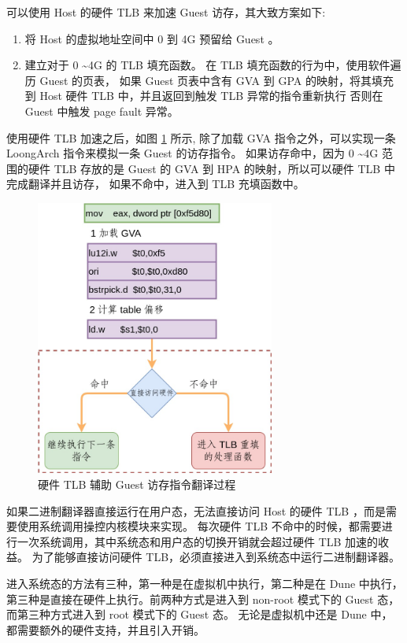 可以使用 Host 的硬件 TLB 来加速 Guest 访存，其大致方案如下:
\begin{enumerate}
	\item 将 Host 的虚拟地址空间中 0 到 4G 预留给 Guest 。
	\item 建立对于 0 \textasciitilde 4G 的 TLB 填充函数。 在 TLB 填充函数的行为中，使用软件遍历 Guest 的页表，
	      如果 Guest 页表中含有 GVA 到 GPA 的映射，将其填充到 Host 硬件 TLB 中，并且返回到触发 TLB 异常的指令重新执行
	      否则在 Guest 中触发 page fault 异常。
\end{enumerate}
使用硬件 TLB 加速之后，如图 \ref{fig:hamt} 所示, 除了加载 GVA 指令之外，可以实现一条 LoongArch 指令来模拟一条 Guest 的访存指令。
如果访存命中，因为 0 \textasciitilde 4G 范围的硬件 TLB 存放的是 Guest 的 GVA 到 HPA 的映射，所以可以硬件 TLB 中完成翻译并且访存，
如果不命中，进入到 TLB 充填函数中。

\begin{figure}[!htbp]
	\centering
	\includegraphics[width=0.7\textwidth]{./images/hamt.jpg}
	\caption{硬件 TLB 辅助 Guest 访存指令翻译过程}
	\label{fig:hamt}
\end{figure}

如果二进制翻译器直接运行在用户态，无法直接访问 Host 的硬件 TLB ，而是需要使用系统调用操控内核模块来实现。
每次硬件 TLB 不命中的时候，都需要进行一次系统调用，其中系统态和用户态的切换开销就会超过硬件 TLB 加速的收益。
为了能够直接访问硬件 TLB，必须直接进入到系统态中运行二进制翻译器。

进入系统态的方法有三种，第一种是在虚拟机中执行，第二种是在 Dune 中执行，
第三种是直接在硬件上执行。前两种方式是进入到 non-root 模式下的 Guest 态，而第三种方式进入到 root 模式下的 Guest 态。
无论是虚拟机中还是 Dune 中，都需要额外的硬件支持，并且引入开销。

